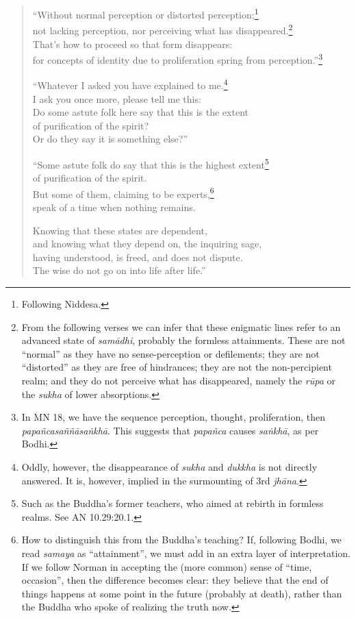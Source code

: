 \documentclass[12pt,openany]{book}%
\begin{document}
\begin{verse}
“Without normal perception or distorted perception;\footnote{Following Niddesa. } \\
not lacking perception, nor perceiving what has disappeared.\footnote{From the following verses we can infer that these enigmatic lines refer to an advanced state of \textit{\textsanskrit{samādhi}}, probably the formless attainments. These are not “normal” as they have no sense-perception or defilements; they are not “distorted” as they are free of hindrances; they are not the non-percipient realm; and they do not perceive what has disappeared, namely the \textit{\textsanskrit{rūpa}} or the \textit{sukha} of lower absorptions. } \\
That’s how to proceed so that form disappears: \\
for concepts of identity due to proliferation spring from perception.”\footnote{In MN 18, we have the sequence perception, thought, proliferation, then \textit{\textsanskrit{papañcasaññāsaṅkhā}}. This suggests that \textit{\textsanskrit{papañca}} causes \textit{\textsanskrit{saṅkhā}}, as per Bodhi. } 

“Whatever I asked you have explained to me.\footnote{Oddly, however, the disappearance of \textit{sukha} and \textit{dukkha} is not directly answered. It is, however, implied in the surmounting of 3rd \textit{\textsanskrit{jhāna}}. } \\
I ask you once more, please tell me this: \\
Do some astute folk here say that this is the extent \\
of purification of the spirit? \\
Or do they say it is something else?” 

“Some astute folk do say that this is the highest extent\footnote{Such as the Buddha’s former teachers, who aimed at rebirth in formless realms. See AN 10.29:20.1. } \\
of purification of the spirit. \\
But some of them, claiming to be experts,\footnote{How to distinguish this from the Buddha’s teaching? If, following Bodhi, we read \textit{samaya} as “attainment”, we must add in an extra layer of interpretation. If we follow Norman in accepting the (more common) sense of “time, occasion”, then the difference becomes clear: they believe that the end of things happens at some point in the future (probably at death), rather than the Buddha who spoke of realizing the truth now. } \\
speak of a time when nothing remains. 

Knowing that these states are dependent, \\
and knowing what they depend on, the inquiring sage, \\
having understood, is freed, and does not dispute. \\
The wise do not go on into life after life.” 

%
\end{verse}
\end{document}
